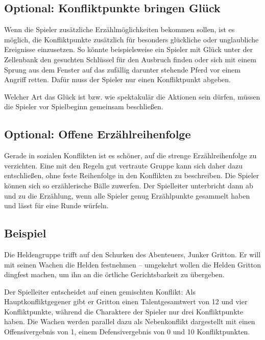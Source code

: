\begin{optional}
\section{Optional: Konfliktpunkte bringen Glück}
Wenn die Spieler zusätzliche Erzählmöglichkeiten bekommen sollen, ist es möglich, die Konfliktpunkte zusätzlich für besonders glückliche oder unglaubliche Ereignisse einzusetzen. So könnte beispielsweise ein Spieler mit Glück unter der Zellenbank den gesuchten Schlüssel für den Ausbruch finden oder sich mit einem Sprung aus dem Fenster auf das zufällig darunter stehende Pferd vor einem Angriff retten. Dafür muss der Spieler nur einen Konfliktpunkt abgeben.

Welcher Art das Glück ist bzw. wie spektakulär die Aktionen sein dürfen, müssen die Spieler vor Spielbeginn gemeinsam beschließen.
\end{optional}

\begin{optional}
\section{Optional: Offene Erzählreihenfolge}
Gerade in sozialen Konflikten ist es schöner, auf die strenge Erzählreihenfolge zu verzichten. Eine mit den Regeln gut vertraute Gruppe kann sich daher dazu entschließen, ohne feste Reihenfolge in den Konflikten zu beschreiben. Die Spieler können sich so erzählerische Bälle zuwerfen. Der Spielleiter unterbricht dann ab und zu die Erzählung, wenn alle Spieler genug Erzählpunkte gesammelt haben und lässt für eine Runde würfeln.
\end{optional}

\subsection{Beispiel}
Die Heldengruppe trifft auf den Schurken des Abenteuers, Junker Gritton. Er will mit seinen Wachen die Helden festnehmen -- umgekehrt wollen die Helden Gritton dingfest machen, um ihn an die örtliche Gerichtsbarkeit zu übergeben.

Der Spielleiter entscheidet auf einen gemischten Konflikt: Als Hauptkonfliktgegener gibt er Gritton einen Talentgesamtwert von 12 und vier Konfliktpunkte, während die Charaktere der Spieler nur drei Konfliktpunkte haben. Die Wachen werden parallel dazu als Nebenkonflikt dargestellt mit einen Offensivergebnis von 1, einem Defensivergebnis von 0 und 10 Konfliktpunkten.

